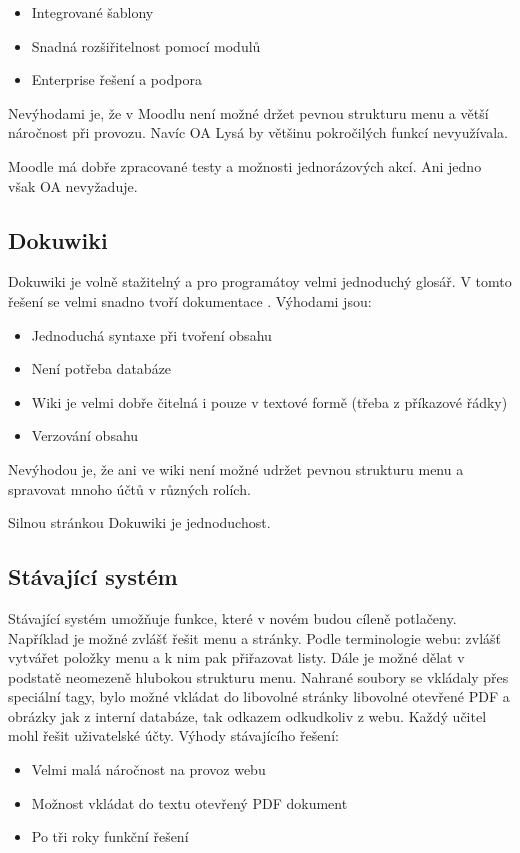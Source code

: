 \documentclass[thesis=B,czech]{FITthesis}[2012/06/26]
\begin{document}
\begin{itemize}
	\item Integrované šablony
	\item Snadná rozšiřitelnost pomocí modulů
	\item Enterprise řešení a podpora
\end{itemize}

Nevýhodami je, že v Moodlu není možné držet pevnou strukturu menu a větší náročnost při provozu. Navíc OA Lysá by většinu pokročilých funkcí nevyužívala.

Moodle má dobře zpracované testy a možnosti jednorázových akcí. Ani jedno však OA nevyžaduje.

\subsection{Dokuwiki}
Dokuwiki je volně stažitelný a pro programátoy velmi jednoduchý glosář. V tomto řešení se velmi snadno tvoří dokumentace \cite{dokuwiki}. Výhodami jsou:

\begin{itemize}
	\item Jednoduchá syntaxe při tvoření obsahu
	\item Není potřeba databáze
	\item Wiki je velmi dobře čitelná i pouze v textové formě (třeba z příkazové řádky)
	\item Verzování obsahu
\end{itemize}

Nevýhodou je, že ani ve wiki není možné udržet pevnou strukturu menu a spravovat mnoho účtů v různých rolích.

Silnou stránkou Dokuwiki je jednoduchost.

\subsection{Stávající systém}
Stávající systém umožňuje funkce, které v novém budou cíleně potlačeny. Například je možné zvlášť řešit menu a stránky. Podle terminologie webu: zvlášť vytvářet položky menu a k nim pak přiřazovat listy. Dále je možné dělat v podstatě neomezeně hlubokou strukturu menu. Nahrané soubory se vkládaly přes speciální tagy, bylo možné vkládat do libovolné stránky libovolné otevřené PDF a obrázky jak z interní databáze, tak odkazem odkudkoliv z webu. Každý učitel mohl řešit uživatelské účty. Výhody stávajícího řešení:

\begin{itemize}
	\item Velmi malá náročnost na provoz webu
	\item Možnost vkládat do textu otevřený PDF dokument
	\item Po tři roky funkční řešení
\end{itemize}
\end{document}
